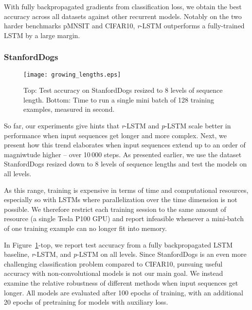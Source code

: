 \documentclass{article}
\newcommand{\rlstm}{{\it r}-LSTM}
\newcommand{\plstm}{{\it p}-LSTM}
\begin{document}
With fully backpropagated gradients from classification loss, we obtain the best accuracy across all datasets against other recurrent models. Notably on the two harder benchmarks pMNSIT and CIFAR10, \rlstm{} outperforms a fully-trained LSTM by a large margin.


\subsubsection{StanfordDogs}


\begin{figure}[tb]
\texttt{[image: growing\_lengths.eps]}
\caption{Top: Test accuracy on StanfordDogs resized to 8 levels of sequence length. Bottom: Time to run a single mini batch of 128 training examples, measured in second.}
\label{fig:growing_lengths}
\end{figure}

So far, our experiments give hints that \rlstm{} and \plstm{} scale better in performance when input sequences get longer and more complex. Next, we present how this trend elaborates when input sequences extend up to an order of magniwtude higher -- over 10\,000 steps. As presented earlier, we use the dataset StanfordDogs resized down to 8 levels of sequence lengths and test the models on all levels.

As this range, training is expensive in terms of time and computational resources, especially so with LSTMs where parallelization over the time dimension is not possible. We therefore restrict each training session to the same amount of resource (a single Tesla P100 GPU) and report infeasible whenever a mini-batch of one training example can no longer fit into memory.

In Figure~\ref{fig:growing_lengths}-top, we report test accuracy from a fully backpropagated LSTM baseline, \rlstm{}, and \plstm{} on all levels. Since StanfordDogs is an even more challenging classification problem compared to CIFAR10, pursuing useful accuracy with non-convolutional models is not our main goal. We instead examine the relative robustness of different methods when input sequences get longer. All models are evaluated after 100 epochs of training, with an additional 20 epochs of pretraining for models with auxiliary loss.
\end{document}
